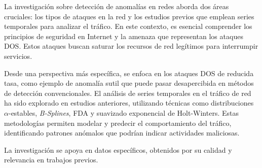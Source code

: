 La investigación sobre detección de anomalías en redes aborda dos áreas cruciales: los tipos de ataques en la red y los estudios previos que emplean series temporales para analizar el tráfico. En este contexto, es esencial comprender los principios de seguridad en Internet y la amenaza que representan los ataques \ac{DOS}. Estos ataques buscan saturar los recursos de red legítimos para interrumpir servicios.

Desde una perspectiva más específica, se enfoca en los ataques \ac{DOS} de reducida tasa, como ejemplo de anomalía sutil que puede pasar desapercibida en métodos de detección convencionales. El análisis de series temporales en el tráfico de red ha sido explorado en estudios anteriores, utilizando técnicas como distribuciones $\alpha$-estables, \textit{B-Splines}, \ac{FDA} y suavizado exponencial de Holt-Winters. Estas metodologías permiten modelar y predecir el comportamiento del tráfico, identificando patrones anómalos que podrían indicar actividades maliciosas.

La investigación se apoya en datos específicos, obtenidos por su calidad y relevancia en trabajos previos.
